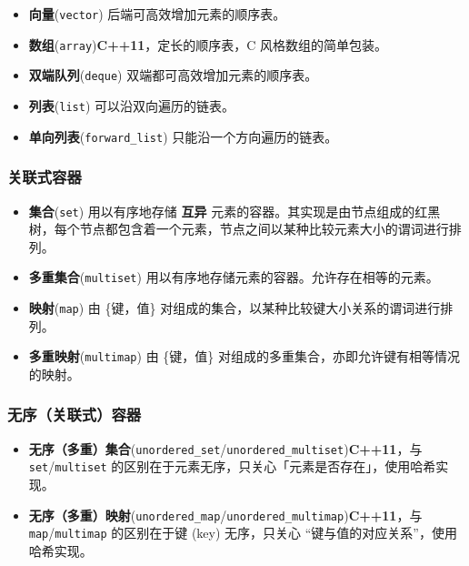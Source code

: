 \begin{itemize}
\tightlist
\item
  \textbf{向量}(\texttt{vector}) 后端可高效增加元素的顺序表。
\item
  \textbf{数组}(\texttt{array})\textbf{C++11}，定长的顺序表，C 风格数组的简单包装。
\item
  \textbf{双端队列}(\texttt{deque}) 双端都可高效增加元素的顺序表。
\item
  \textbf{列表}(\texttt{list}) 可以沿双向遍历的链表。
\item
  \textbf{单向列表}(\texttt{forward\_list}) 只能沿一个方向遍历的链表。
\end{itemize}

\subsubsection{关联式容器}\label{ux5173ux8054ux5f0fux5bb9ux5668}

\begin{itemize}
\tightlist
\item
  \textbf{集合}(\texttt{set}) 用以有序地存储 \textbf{互异} 元素的容器。其实现是由节点组成的红黑树，每个节点都包含着一个元素，节点之间以某种比较元素大小的谓词进行排列。
\item
  \textbf{多重集合}(\texttt{multiset}) 用以有序地存储元素的容器。允许存在相等的元素。
\item
  \textbf{映射}(\texttt{map}) 由 \{键，值\} 对组成的集合，以某种比较键大小关系的谓词进行排列。
\item
  \textbf{多重映射}(\texttt{multimap}) 由 \{键，值\} 对组成的多重集合，亦即允许键有相等情况的映射。
\end{itemize}

\subsubsection{无序（关联式）容器}\label{ux65e0ux5e8fux5173ux8054ux5f0fux5bb9ux5668}

\begin{itemize}
\tightlist
\item
  \textbf{无序（多重）集合}(\texttt{unordered\_set}/\texttt{unordered\_multiset})\textbf{C++11}，与 \texttt{set}/\texttt{multiset} 的区别在于元素无序，只关心「元素是否存在」，使用哈希实现。
\item
  \textbf{无序（多重）映射}(\texttt{unordered\_map}/\texttt{unordered\_multimap})\textbf{C++11}，与 \texttt{map}/\texttt{multimap} 的区别在于键 (key) 无序，只关心 ``键与值的对应关系''，使用哈希实现。
\end{itemize}

